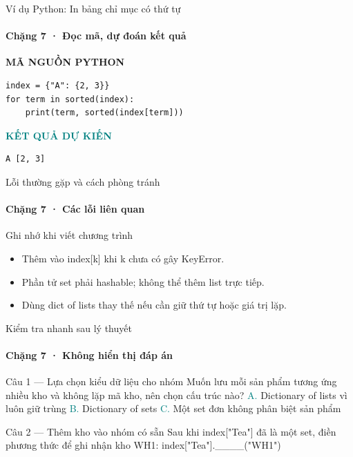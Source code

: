 \documentclass[aspectratio=169,10pt]{beamer}
\begin{document}
\begin{frame}[fragile,t]{Ví dụ Python: In bảng chỉ mục có thứ tự}
\framesubtitle{Chặng 7 · Đọc mã, dự đoán kết quả}
\vspace{-1mm}
{\small\color{muted}\textbf{MÃ NGUỒN PYTHON}}\par\vspace{1mm}
\begin{Verbatim}[fontsize=\scriptsize,frame=single,framesep=4mm,rulecolor=\color{teal!35},breaklines=true]
index = {"A": {2, 3}}
for term in sorted(index):
    print(term, sorted(index[term]))
\end{Verbatim}
\vspace{1mm}\textcolor{teal}{\scriptsize\textbf{KẾT QUẢ DỰ KIẾN}}
\begin{Verbatim}[fontsize=\scriptsize,breaklines=true]
A [2, 3]
\end{Verbatim}

\end{frame}

\begin{frame}[t]{Lỗi thường gặp và cách phòng tránh}
\framesubtitle{Chặng 7 · Các lỗi liên quan}
\begin{alertblock}{Ghi nhớ khi viết chương trình}
\begin{itemize}
\item Thêm vào index[k] khi k chưa có gây KeyError.
\item Phần tử set phải hashable; không thể thêm list trực tiếp.
\item Dùng dict of lists thay thế nếu cần giữ thứ tự hoặc giá trị lặp.
\end{itemize}
\end{alertblock}

\end{frame}

\begin{frame}[t]{Kiểm tra nhanh sau lý thuyết}
\framesubtitle{Chặng 7 · Không hiển thị đáp án}
\small\begin{block}{Câu 1 — Lựa chọn kiểu dữ liệu cho nhóm}
Muốn lưu mỗi sản phẩm tương ứng nhiều kho và không lặp mã kho, nên chọn cấu trúc nào?
\medskip
\quad \textcolor{teal}{A.} Dictionary of lists vì luôn giữ trùng\hspace{3mm}
\quad \textcolor{teal}{B.} Dictionary of sets\hspace{3mm}
\quad \textcolor{teal}{C.} Một set đơn không phân biệt sản phẩm\hspace{3mm}
\end{block}
\begin{block}{Câu 2 — Thêm kho vào nhóm có sẵn}
Sau khi index["Tea"] đã là một set, điền phương thức để ghi nhận kho WH1: index["Tea"].\_\_\_\_("WH1")
\end{block}
\end{frame}
\end{document}
